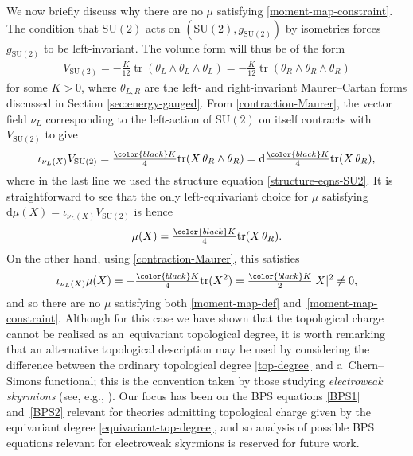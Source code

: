 \documentclass[pdftex]{sigma}
\newcommand{\SU}{{\mathrm{SU}}}
\newcommand{\1}{{\mathbb{1}}}
\def \d{\mathrm{d}}
\newcommand{\tr}{{\operatorname{tr}}}
\numberwithin{equation}{section}
\begin{document}
We now briefly discuss why there are no $\mu$ satisfying \eqref{moment-map-constraint}. The condition that $\SU(2)$ acts on $(\SU(2),g_{\SU(2)})$ by isometries forces $g_{\SU(2)}$ to be left-invariant. The volume form will thus be of the form
\begin{align*}
 V_{\SU(2)}=-\frac{K}{12}\tr(\theta_L\wedge\theta_L\wedge\theta_L)=-\frac{K}{12}\tr(\theta_R\wedge\theta_R\wedge\theta_R)
\end{align*}
for some $K>0$, where $\theta_{L,R}$ are the left- and right-invariant Maurer--Cartan forms discussed in Section \ref{sec:energy-gauged}. From \eqref{contraction-Maurer}, the vector field $\nu_L$ corresponding to the left-action of $\SU(2)$ on itself contracts with $V_{\SU(2)}$ to give
\begin{align*}
 \iota_{\nu_L(X)}V_{\SU(2)}=\tfrac{\begingroup\color{black}K\endgroup}{4}\tr(X\,\theta_R\wedge\theta_R)=\d\tfrac{\begingroup\color{black}K\endgroup}{4}\tr(X\,\theta_R),
\end{align*}
where in the last line we used the structure equation \eqref{structure-eqns-SU2}. It is straightforward to see that the only left-equivariant choice for $\mu$ satisfying $\d\mu(X)=\iota_{\nu_L(X)}V_{\SU(2)}$ is hence
\begin{align*}
 \mu(X)=\tfrac{\begingroup\color{black}K\endgroup}{4}\tr(X\,\theta_R).
\end{align*}
On the other hand, using \eqref{contraction-Maurer}, this satisfies
\begin{align*}
 \iota_{\nu_L(X)}\mu(X)=-\tfrac{\begingroup\color{black}K\endgroup}{4}\tr(X^2)=\tfrac{\begingroup\color{black}K\endgroup}{2}|X|^2\neq0,
\end{align*}
and so there are no $\mu$ satisfying both \eqref{moment-map-def} and~\eqref{moment-map-constraint}.
Although for this case we have shown that the topological charge cannot be realised as an~equivariant topological degree, it is worth remarking that an alternative topological description may be used by considering the difference between the ordinary topological degree \eqref{top-degree} and a~Chern--Simons functional; this is the convention taken by those studying \textit{electroweak skyrmions} (see, e.g., \cite{criadoKhozeSpannowsky2021emergence,dHokerFarhi1984decoupling}). Our focus has been on the BPS equations \eqref{BPS1} and~\eqref{BPS2} relevant for theories admitting topological charge given by the equivariant degree \eqref{equivariant-top-degree}, and so analysis of possible BPS equations relevant for electroweak skyrmions is reserved for future work.
\end{document}
